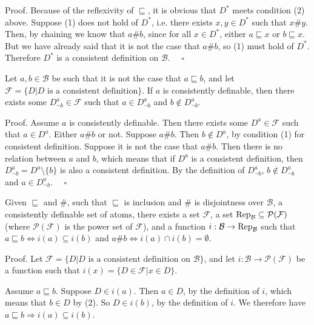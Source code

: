 Proof. Because of the reflexivity of $\sqsubseteq$, it is obvious that  $D^*$ meets condition (2) above. Suppose (1) does not hold of $D^*$, i.e. there exists $x,y\in D^*$ such that $x\#y$. Then, by chaining we know that $a\#b$, since for all $x\in D^*$, either $a\sqsubseteq x$ or $b\sqsubseteq x$. But we have already said that it is not the case that $a\#b$, so (1) must hold of $D^*$. Therefore $D^*$ is a consistent definition on $\mathcal{B}$. $\quad\square$
\par\vspace{3mm}
Let $a,b\in\mathcal{B}$ be such that it is not the case that $a\sqsubseteq b$, and let $\mathcal{F}=\{D\vert D\text{ is a consistent definition}\}$. If $a$ is consistently definable, then there exists some $D_{\lnot b}^a\in\mathcal{F}$ such that $a\in D_{\lnot b}^a$ and $b\notin D_{\lnot b}^a$.

Proof. Assume $a$ is consistently definable. Then there exists some $D^a\in\mathcal{F}$ such that $a\in D^a$. Either $a\# b$ or not. Suppose $a\#b$. Then $b\notin D^a$, by condition (1) for consistent definition. Suppose it is not the case that $a\#b$. Then there is no relation between $a$ and $b$, which means that if $D^a$ is a consistent definition, then $D_{\lnot b}^a=D^a\setminus\{b\}$ is also a consistent definition. By the definition of $D_{\lnot b}^a$, $b\notin D_{\lnot b}^a$ and $a\in D_{\lnot b}^a$. $\quad\square$
\par\vspace{3mm}
 Given $\sqsubseteq $ and $\#$,  such that $\sqsubseteq $ is inclusion and $\#$ is disjointness over $\mathcal{B}$, a consistently definable set of atoms, there exists a set $\mathcal{F}$, a set $\operatorname{Rep}_\mathcal{B}\subseteq\mathcal{P}(\mathcal{F})$ (where $\mathcal{P}(\mathcal{F})$ is the power set of $\mathcal{F}$), and a function $i:\mathcal{B}\rightarrow\operatorname{Rep}_\mathcal{B}$ such that $a\sqsubseteq b\Leftrightarrow i(a)\subseteq i(b)$  and $a\#b\Leftrightarrow i(a)\cap i(b)=\emptyset$.

Proof. Let $\mathcal{F}=\{D\vert D\text{ is a consistent definition on }\mathcal{B}\}$, and let $i:\mathcal{B}\rightarrow\mathcal{P}(\mathcal{F})$ be a function such that $i(x)=\{D\in\mathcal{F}\vert x\in D\}$.

Assume $a\sqsubseteq b$. Suppose $D\in i(a)$. Then $a\in D$, by the definition of $i$, which means that $b\in D$ by (2). So $D\in i(b)$, by the definition of $i$. We therefore have $a\sqsubseteq b\Rightarrow i(a)\subseteq i(b)$.

